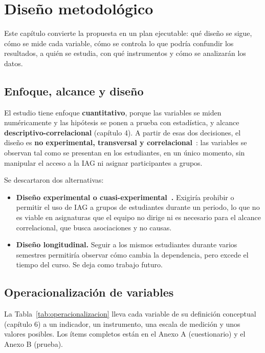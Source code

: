 \documentclass[12pt,letterpaper]{article}
\numberwithin{table}{section}
\numberwithin{figure}{section}
\begin{document}
\section{Diseño metodológico}

Este capítulo convierte la propuesta en un plan ejecutable: qué diseño se sigue, cómo se mide cada variable, cómo se controla lo que podría confundir los resultados, a quién se estudia, con qué instrumentos y cómo se analizarán los datos.

\subsection{Enfoque, alcance y diseño}

El estudio tiene enfoque \textbf{cuantitativo}, porque las variables se miden numéricamente y las hipótesis se ponen a prueba con estadística, y alcance \textbf{descriptivo-correlacional} (capítulo 4). A partir de esas dos decisiones, el diseño es \textbf{no experimental, transversal y correlacional}~\cite{hernandez2014metodologia,creswell2018research}: las variables se observan tal como se presentan en los estudiantes, en un único momento, sin manipular el acceso a la IAG ni asignar participantes a grupos.

Se descartaron dos alternativas:

\begin{itemize}
  \item \textbf{Diseño experimental o cuasi-experimental~\cite{campbell1963experimental}.} Exigiría prohibir o permitir el uso de IAG a grupos de estudiantes durante un periodo, lo que no es viable en asignaturas que el equipo no dirige ni es necesario para el alcance correlacional, que busca asociaciones y no causas.
  \item \textbf{Diseño longitudinal.} Seguir a los mismos estudiantes durante varios semestres permitiría observar cómo cambia la dependencia, pero excede el tiempo del curso. Se deja como trabajo futuro.
\end{itemize}

\subsection{Operacionalización de variables}

La Tabla~\ref{tab:operacionalizacion} lleva cada variable de su definición conceptual (capítulo 6) a un indicador, un instrumento, una escala de medición y unos valores posibles. Los ítems completos están en el Anexo A (cuestionario) y el Anexo B (prueba).
\end{document}
